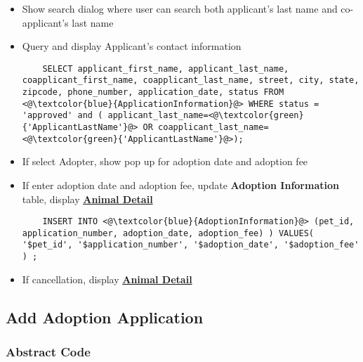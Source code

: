 \documentclass[a4paper]{article}
\begin{document}
\begin{itemize}
	\item Show search dialog where user can search both applicant's last name and co-applicant's last name

	\item Query and display Applicant's contact information
	\begin{lstlisting}
	SELECT applicant_first_name, applicant_last_name, coapplicant_first_name, coapplicant_last_name, street, city, state, zipcode, phone_number, application_date, status FROM <@\textcolor{blue}{ApplicationInformation}@> WHERE status = 'approved' and ( applicant_last_name=<@\textcolor{green}{'ApplicantLastName'}@> OR coapplicant_last_name=<@\textcolor{green}{'ApplicantLastName'}@>);
	\end{lstlisting}
	\item If select Adopter, show pop up for adoption date and adoption fee
	\item If enter adoption date and adoption fee, update
	\textbf{Adoption Information}  table, display  \underline{\textbf{Animal Detail}}
	\begin{lstlisting}
	INSERT INTO <@\textcolor{blue}{AdoptionInformation}@> (pet_id, application_number, adoption_date, adoption_fee) ) VALUES( '$pet_id', '$application_number', '$adoption_date', '$adoption_fee' ) ;
	\end{lstlisting}

	\item If cancellation, display  \underline{\textbf{Animal Detail}}
\end{itemize}


\hypertarget{add_adoption_app}{\subsection{Add Adoption Application}}

\subsubsection*{Abstract Code}
\end{document}
